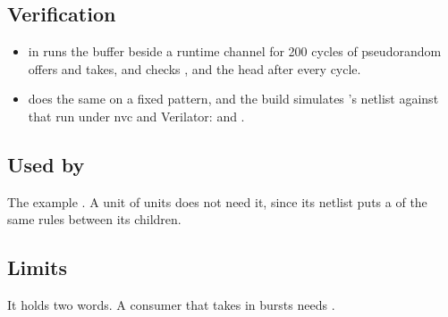 \subsection*{Verification}

\begin{itemize}
\item {} in 
runs the buffer beside a runtime channel for 200 cycles of pseudorandom
offers and takes, and checks ,  and the head
after every cycle.
\item {} does the same on a fixed pattern, and the build
simulates 's netlist against that run under nvc and
Verilator:  and
.
\end{itemize}

\subsection*{Used by}

The example . A unit of units does not need it, since
its netlist puts a  of the same rules between its
children.

\subsection*{Limits}

It holds two words. A consumer that takes in bursts needs .
